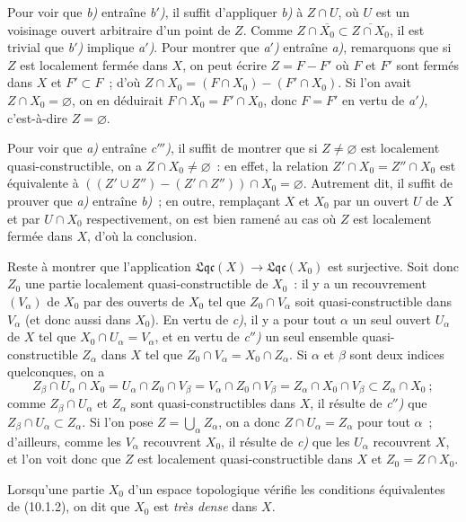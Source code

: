 Pour voir que \emph{b)} entraîne \emph{b$'$)}, il suffit d'appliquer
\emph{b)} à $Z\cap U$, où $U$ est un voisinage ouvert arbitraire d'un point de
$Z$. Comme $Z\cap\overline{X_0}\subset\overline{Z\cap X_0}$, il est trivial
que \emph{b$'$)} implique \emph{a$'$)}. Pour montrer que \emph{a$'$)} entraîne
\emph{a)}, remarquons que si $Z$ est localement fermée dans $X$, on peut
écrire $Z=F-F'$ où $F$ et $F'$ sont fermés dans $X$ et $F'\subset F$~; d'où
$Z\cap X_0=(F\cap X_0)-(F'\cap X_0)$. Si l'on avait
$Z\cap X_0=\varnothing$, on en déduirait $F\cap X_0=F'\cap X_0$, donc
$F=F'$ en vertu de \emph{a$'$)}, c'est-à-dire $Z=\varnothing$.

Pour voir que \emph{a)} entraîne \emph{c$'''$)}, il suffit de montrer que si
$Z\neq\varnothing$ est localement quasi-constructible, on a
$Z\cap X_0\neq\varnothing$~: en effet, la relation
$Z'\cap X_0=Z''\cap X_0$ est équivalente à
$((Z'\cup Z'')-(Z'\cap Z''))\cap X_0=\varnothing$. Autrement dit, il suffit de
prouver que \emph{a)} entraîne \emph{b)}~; en outre, remplaçant $X$ et $X_0$
par un ouvert $U$ de $X$ et par $U\cap X_0$ respectivement, on est bien
ramené au cas où $Z$ est localement fermée dans $X$, d'où la conclusion.

Reste à montrer que l'application
$\mathfrak{Lqc}(X)\to\mathfrak{Lqc}(X_0)$ est surjective. Soit donc $Z_0$ une
partie localement quasi-constructible de $X_0$~: il y a un recouvrement
$(V_\alpha)$ de $X_0$ par des ouverts de $X_0$ tel que $Z_0\cap V_\alpha$ soit
quasi-constructible dans $V_\alpha$ (et
donc aussi dans $X_0$). En vertu de \emph{c)}, il y a pour tout $\alpha$ un
seul ouvert $U_\alpha$ de $X$ tel que $X_0\cap U_\alpha=V_\alpha$, et en
vertu de \emph{c$''$)} un seul ensemble quasi-constructible $Z_\alpha$ dans
$X$ tel que $Z_0\cap V_\alpha=X_0\cap Z_\alpha$. Si $\alpha$ et $\beta$ sont
deux indices quelconques, on a
\[
Z_\beta\cap U_\alpha\cap X_0
=U_\alpha\cap Z_0\cap V_\beta
=V_\alpha\cap Z_0\cap V_\beta
=Z_\alpha\cap X_0\cap V_\beta
\subset Z_\alpha\cap X_0~;
\]
comme $Z_\beta\cap U_\alpha$ et $Z_\alpha$ sont quasi-constructibles dans
$X$, il résulte de \emph{c$''$)} que
$Z_\beta\cap U_\alpha\subset Z_\alpha$. Si l'on pose
$Z=\bigcup_\alpha Z_\alpha$, on a donc $Z\cap U_\alpha=Z_\alpha$ pour tout
$\alpha$~; d'ailleurs, comme les $V_\alpha$ recouvrent $X_0$, il résulte de
\emph{c)} que les $U_\alpha$ recouvrent $X$, et l'on voit donc que $Z$ est
localement quasi-constructible dans $X$ et $Z_0=Z\cap X_0$.

\begin{definition}[10.1.3]
\label{IV.10.1.3-fr}
Lorsqu'une partie $X_0$ d'un espace topologique vérifie les conditions
équivalentes de (10.1.2), on dit que $X_0$ est \emph{très dense} dans $X$.
\end{definition}

